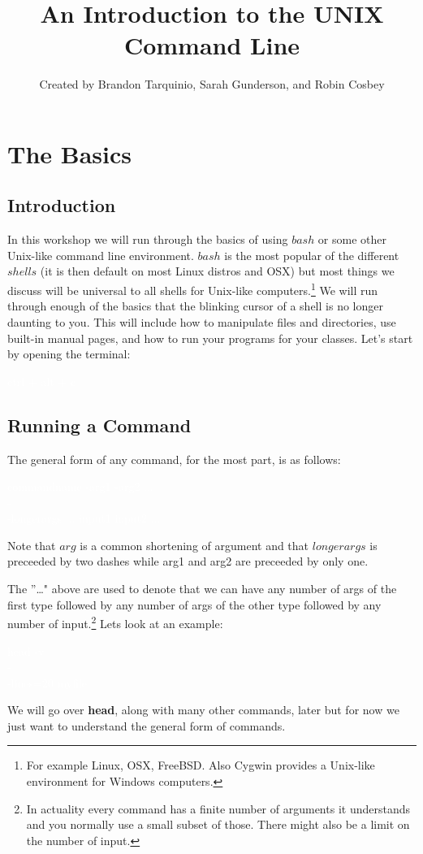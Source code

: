 \documentclass[oneside]{book}
\newcommand{\commandline}[1]{\begin{center} \colorbox{Dark}{\textcolor{white}{#1}} \end{center}}
\begin{document}
\title{An Introduction to the UNIX Command Line}
\author{Created by Brandon Tarquinio, Sarah Gunderson, and Robin Cosbey}
\date{}

\maketitle
\tableofcontents
\newpage

\chapter{The Basics}

\section{Introduction}
In this workshop we will run through the basics of using $bash$ or some other Unix-like command line environment. $bash$ is the most popular of the different $shells$ (it is then default on most Linux distros and OSX) but most things we discuss will be universal to all shells for Unix-like computers.\footnote{For example Linux, OSX, FreeBSD. Also Cygwin provides a Unix-like environment for Windows computers.} We will run through enough of the basics that the blinking cursor of a shell is no longer daunting to you. This will include how to manipulate files and directories, use built-in manual pages, and how to run your programs for your classes. Let's start by opening the terminal:

\commandline{ctrl + alt + c}


\section{Running a Command}
The general form of any command, for the most part, is as follows:
\commandline{commandname -arg1 -arg2 ... \ \\-\\-longerargs ... input1 input2 ...}
Note that $arg$ is a common shortening of argument and that $longerargs$ is preceeded by two dashes while arg1 and arg2 are preceeded by only one.


The ''\dots" above are used to denote that we can have any number of args of the first type followed by any number of args of the other type followed by any number of input.\footnote{In actuality every command has a finite number of arguments it understands and you normally use a small subset of those. There might also be a limit on the number of input.}
Lets look at an example:
\commandline{head -v \ \\-\\-lines=20 myfile}
We will go over \textbf{head}, along with many other commands, later but for now we just want to understand the general form of commands. 
\end{document}
